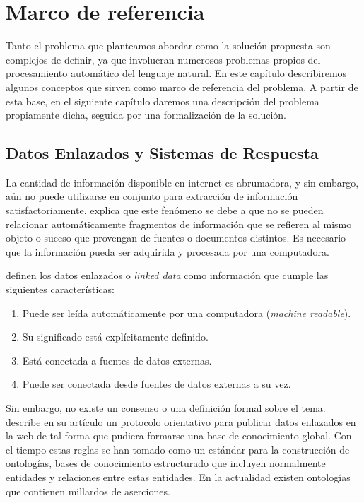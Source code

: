 
\chapter{Marco de referencia}

Tanto el problema que planteamos abordar como la solución propuesta son complejos de definir, ya que involucran numerosos problemas propios del procesamiento automático del lenguaje natural. En este capítulo describiremos algunos conceptos que sirven como marco de referencia del problema. A partir de esta base, en el siguiente capítulo daremos una descripción del problema propiamente dicha, seguida por una formalización de la solución.

\section{Datos Enlazados y Sistemas de Respuesta}

La cantidad de información disponible en internet es abrumadora, y sin embargo, aún no puede utilizarse en conjunto para extracción de información satisfactoriamente. \citet{BernersLeeLinkedDataGuide} explica que este fenómeno se debe a que no se pueden relacionar automáticamente fragmentos de información que se refieren al mismo objeto o suceso que provengan de fuentes o documentos distintos. Es necesario que la información pueda ser adquirida y procesada por una computadora.

\citet{BizerLinkedData} definen los datos enlazados o \textit{linked data} como información que cumple las siguientes características:
\begin{enumerate}
    \item Puede ser leída automáticamente por una computadora (\textit{machine readable}).
    \item Su significado está explícitamente definido.
    \item Está conectada a fuentes de datos externas.
    \item Puede ser conectada desde fuentes de datos externas a su vez.
\end{enumerate}

Sin embargo, no existe un consenso o una definición formal sobre el tema. \citet{BernersLeeLinkedDataGuide} describe en su artículo un protocolo orientativo para publicar datos enlazados en la web de tal forma que pudiera formarse una base de conocimiento global. Con el tiempo estas reglas se han tomado como un estándar para la construcción de ontologías, bases de conocimiento estructurado que incluyen normalmente entidades y relaciones entre estas entidades. En la actualidad existen ontologías que contienen millardos de aserciones.

